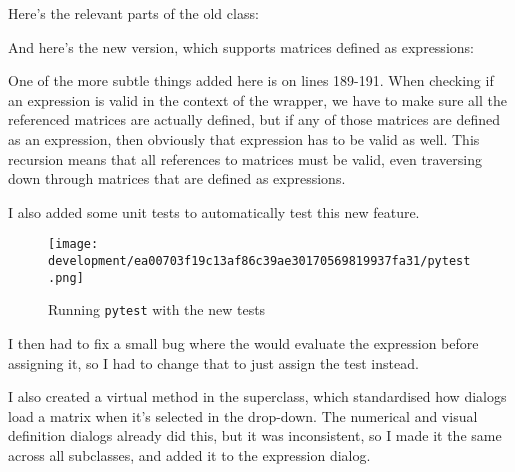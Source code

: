 \documentclass[../development.tex]{subfiles}
\begin{document}
Here's the relevant parts of the old  class:


And here's the new version, which supports matrices defined as expressions:


One of the more subtle things added here is on lines 189-191. When checking if an expression is valid in the context of the wrapper, we have to make sure all the referenced matrices are actually defined, but if any of those matrices are defined as an expression, then obviously that expression has to be valid as well. This recursion means that all references to matrices must be valid, even traversing down through matrices that are defined as expressions.

I also added some unit tests to automatically test this new feature.



\begin{figure}[H]
	\centering
	\texttt{[image: development/ea00703f19c13af86c39ae30170569819937fa31/pytest.png]}
	\caption{Running \texttt{pytest} with the new tests}
	\label{fig:development:ea00703f19c13af86c39ae30170569819937fa31:pytest.png}
\end{figure}

I then had to fix a small bug where the  would evaluate the expression before assigning it, so I had to change that to just assign the test instead.


I also created a virtual method in the  superclass, which standardised how dialogs load a matrix when it's selected in the drop-down. The numerical and visual definition dialogs already did this, but it was inconsistent, so I made it the same across all subclasses, and added it to the expression dialog.

\end{document}

